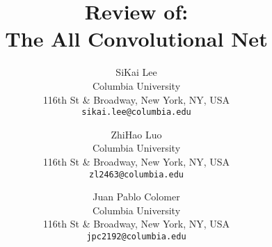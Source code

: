 \documentclass[10pt,twocolumn,letterpaper]{article}
\begin{document}

\title{Review of:\\
The All Convolutional Net}


\author{
SiKai Lee\\
Columbia University\\
116th St \& Broadway, New York, NY, USA\\
{\tt\small sikai.lee@columbia.edu}
\and
ZhiHao Luo\\
Columbia University\\
116th St \& Broadway, New York, NY, USA\\
{\tt\small zl2463@columbia.edu}
\and
Juan Pablo Colomer\\
Columbia University\\
116th St \& Broadway, New York, NY, USA\\
{\tt\small jpc2192@columbia.edu}
}
\maketitle







{\small


}
\end{document}
